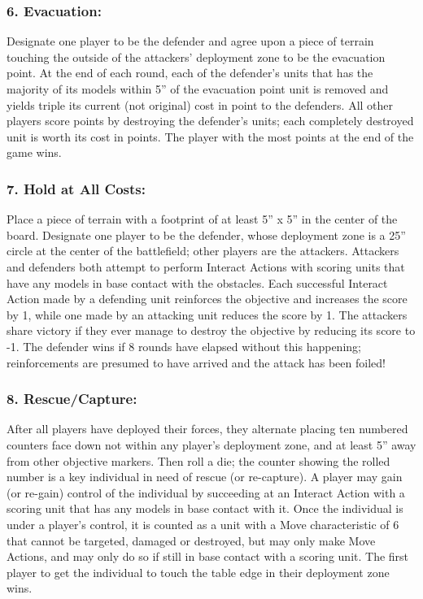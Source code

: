 \begin{multicols}{2}
\subsubsection*{6. Evacuation:} Designate one player to be the defender and agree upon a piece of terrain touching the outside of the attackers' deployment zone to be the evacuation point. At the end of each round, each of the defender's units that has the majority of its models within 5'' of the evacuation point unit is removed and yields triple its current (not original) cost in point to the defenders. All other players score points by destroying the defender's units; each completely destroyed unit is worth its cost in points. The player with the most points at the end of the game wins.

\subsubsection*{7. Hold at All Costs:} Place a piece of terrain with a footprint of at least 5'' x 5'' in the center of the board. Designate one player to be the defender, whose deployment zone is a 25'' circle at the center of the battlefield; other players are the attackers. Attackers and defenders both attempt to perform Interact Actions with scoring units that have any models in base contact with the obstacles. Each successful Interact Action made by a defending unit reinforces the objective and increases the score by 1, while one made by an attacking unit reduces the score by 1. The attackers share victory if they ever manage to destroy the objective by reducing its score to -1. The defender wins if 8 rounds have elapsed without this happening; reinforcements are presumed to have arrived and the attack has been foiled!

\subsubsection*{8. Rescue/Capture:} After all players have deployed their forces, they alternate placing ten numbered counters face down not within any player's deployment zone, and at least 5'' away from other objective markers. Then roll a die; the counter showing the rolled number is a key individual in need of rescue (or re-capture). A player may gain (or re-gain) control of the individual by succeeding at an Interact Action with a scoring unit that has any models in base contact with it. Once the individual is under a player's control, it is counted as a unit with a Move characteristic of 6 that cannot be targeted, damaged or destroyed, but may only make Move Actions, and may only do so if still in base contact with a scoring unit. The first player to get the individual to touch the table edge in their deployment zone wins.


\end{multicols}
